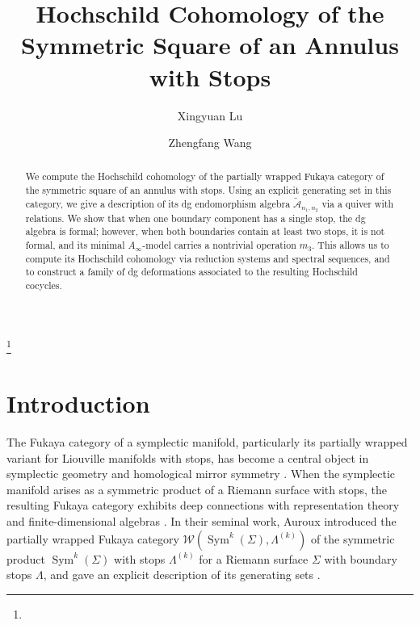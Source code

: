 \documentclass[a4paper, reqno, 11pt]{amsart}
\theoremstyle{definition}
\begin{document}
	\title[Symmetric Square]{Hochschild Cohomology of the Symmetric Square of an Annulus with Stops}
	
	\author{Xingyuan Lu}
	\address{School of Mathematics, Nanjing University, Nanjing 210093, Jiangsu, China}
	\curraddr{}
	\author{Zhengfang Wang}
	\address{School of Mathematics, Nanjing University, Nanjing 210093, Jiangsu, China}
	
	
	
	\thanks{}
	\date{}
	\dedicatory{}
	\begin{abstract}
		We compute the Hochschild cohomology of the partially wrapped Fukaya category of the symmetric square of an annulus with stops. Using an explicit generating set in this category, we give a description of its dg endomorphism algebra $\widetilde{\mathcal{A}}_{n_1,n_2}$ via a quiver with relations. We show that when one boundary component has a single stop, the dg algebra is formal; however, when both boundaries contain at least two stops, it is not formal, and its minimal $A_\infty$-model carries a nontrivial operation $m_3$. This allows us to compute its Hochschild cohomology via reduction systems and spectral sequences, and to construct a family of dg deformations associated to the resulting Hochschild cocycles. %
	\end{abstract}
	\maketitle
	
	
	
	
	
	
	
	\section{Introduction}
	
	The Fukaya category of a symplectic manifold, particularly its partially wrapped variant for Liouville manifolds with stops, has become a central object in symplectic geometry and homological mirror symmetry \cite{Fukaya-Seidel-Smith2009, Sylvan2019}. When the symplectic manifold arises as a symmetric product of a Riemann surface with stops, the resulting Fukaya category exhibits deep connections with representation theory and finite-dimensional algebras \cite{Auroux2010a, Auroux2010b}. In their seminal work, Auroux introduced the partially wrapped Fukaya category $\mathcal{W}(\operatorname{Sym}^k(\Sigma), \Lambda^{(k)})$ of the symmetric product $\operatorname{Sym}^k(\Sigma)$ with stops $\Lambda^{(k)}$ for a Riemann surface $\Sigma$ with boundary stops $\Lambda$, and gave an explicit description of its generating sets \cite{Auroux2010a}.
	
\end{document}
